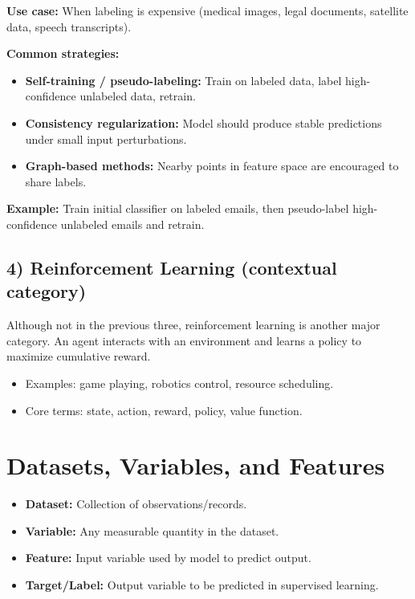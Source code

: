 \documentclass[12pt,a4paper]{article}
\begin{document}
\textbf{Use case:} When labeling is expensive (medical images, legal documents, satellite data, speech transcripts).

\textbf{Common strategies:}
\begin{itemize}[noitemsep]
    \item \textbf{Self-training / pseudo-labeling:} Train on labeled data, label high-confidence unlabeled data, retrain.
    \item \textbf{Consistency regularization:} Model should produce stable predictions under small input perturbations.
    \item \textbf{Graph-based methods:} Nearby points in feature space are encouraged to share labels.
\end{itemize}

\textbf{Example:} Train initial classifier on labeled emails, then pseudo-label high-confidence unlabeled emails and retrain.

\subsection*{4) Reinforcement Learning (contextual category)}
Although not in the previous three, reinforcement learning is another major category.
An agent interacts with an environment and learns a policy to maximize cumulative reward.
\begin{itemize}[noitemsep]
    \item Examples: game playing, robotics control, resource scheduling.
    \item Core terms: state, action, reward, policy, value function.
\end{itemize}

\section{\textcolor{primary}{Datasets, Variables, and Features}}

\begin{itemize}[noitemsep]
    \item \textbf{Dataset:} Collection of observations/records.
    \item \textbf{Variable:} Any measurable quantity in the dataset.
    \item \textbf{Feature:} Input variable used by model to predict output.
    \item \textbf{Target/Label:} Output variable to be predicted in supervised learning.
\end{itemize}
\end{document}
